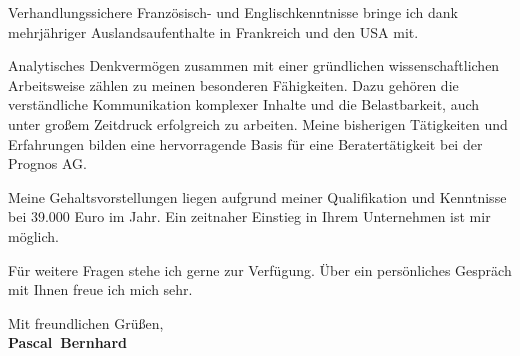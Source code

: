 \documentclass[11pt,a4paper]{article}
\def\firstname{Pascal}
\def\familyname{Bernhard}
\begin{document}
Verhandlungssichere Französisch- und Englischkenntnisse bringe ich dank mehrjähriger Auslandsaufenthalte in Frankreich und den USA mit.

Analytisches Denk­ver­mögen zusammen mit einer gründlichen wissenschaftlichen Arbeitsweise zählen zu meinen besonderen Fähigkeiten. Dazu gehören die verständliche Kommunikation komplexer Inhalte und die Belast­barkeit, auch unter großem Zeitdruck erfolgreich zu arbeiten. Meine bisherigen Tätigkeiten und Erfahrungen bilden eine hervorragende Basis für eine Beratertätigkeit bei der Prognos AG.

Meine Gehaltsvorstellungen liegen aufgrund meiner Qualifikation und Kenntnisse bei 39.000 Euro im Jahr. Ein zeitnaher Einstieg in Ihrem Unternehmen ist mir möglich.


Für weitere Fragen stehe ich gerne zur Verfügung. Über ein persönliches Gespräch mit Ihnen freue ich mich sehr.

  
Mit freundlichen Grüßen,\\[3em] %
%
{\bfseries \firstname~\familyname}\\
%
\end{document}
